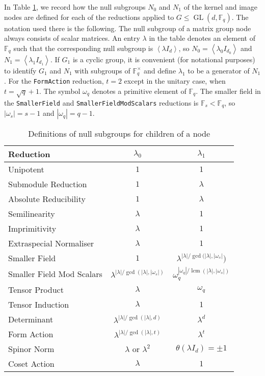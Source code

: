 \documentclass[12pt,twoside,reqno,psamsfonts]{amsproc}
\newcommand{\nullsubgp}{{null subgroup}\xspace}
\numberwithin{equation}{section}
\numberwithin{figure}{section}
\theoremstyle{plain}
\theoremstyle{definition}
\theoremstyle{remark}
\providecommand{\abs}[1]{\left\lvert #1 \right\rvert}
\providecommand{\set}[1]{\left\lbrace #1 \right\rbrace}
\providecommand{\gen}[1]{\left\langle #1 \right\rangle}
\newcommand{\field}[1]{\mathbb{#1}}
\newcommand{\F}{\field{F}}
\DeclareMathOperator{\lcm}{lcm}
\DeclareMathOperator{\GL}{GL}
\begin{document}
In Table \ref{tbl:scalar_propagation}, we record how 
the {\nullsubgp}s $N_0$ and $N_1$ of the kernel and image nodes are defined for 
each of the reductions applied to $G \leqslant \GL(d,\F_q)$.
The notation used there is the following.
The {\nullsubgp} of a matrix group node always consists of scalar matrices.
An entry $\lambda$ in the table denotes an element of $\F_q$  such that 
the corresponding {\nullsubgp} is $\gen{\lambda I_d}$, 
so $N_0=\gen{\lambda_0 I_{d_0}}$ and $N_1 = \gen{\lambda_1 I_{d_1}}$.
If $G_1$ is a cyclic group, it is convenient (for notational purposes) 
to identify $G_1$ and $N_1$
with subgroups of $\F_q^\times$ and define $\lambda_1$ to be a
generator of $N_1$.
For the {\tt FormAction} reduction, $t = 2$ except in the unitary case, 
when $t = \sqrt{q} + 1$. 
The symbol $\omega_q$ denotes a primitive element of $\F_q$.
The smaller field in the
{\tt SmallerField} and {\tt SmallerFieldModScalars} reductions is
$\F_s < \F_q$, so $\abs{ \omega_s}  = s-1$ and $\abs{\omega_q} =q-1$.

\begin{table}[h]
\begin{tabular}{l|c|c}
Reduction & $\lambda_0$ & $\lambda_1$ \\
\hline
Unipotent & $1$ & $1$ \\
Submodule Reduction & $1$ & $\lambda$ \\
Absolute Reducibility & $1$ & $\lambda$ \\
Semilinearity & $\lambda$ & $1$ \\
Imprimitivity & $\lambda$ & $1$ \\
Extraspecial Normaliser & $\lambda$ & $1$ \\
Smaller Field & $1$ & $\lambda^{\abs{\lambda} / 
\gcd(\abs{\lambda}, \abs{\omega_s}})$ \\
Smaller Field Mod Scalars & 
$\lambda^{\abs{\lambda} / \gcd(\abs{\lambda}, \abs{\omega_s})}$ & 
                            $\omega_q^{\abs{\omega_q} / \lcm(\abs{\lambda}, \abs{\omega_s})}$  \\
Tensor Product & $\lambda$ & $\omega_q$  \\
Tensor Induction & $\lambda$ & $1$ \\
Determinant & $\lambda^{\abs{\lambda} / \gcd(\abs{\lambda}, d)}$ & $\lambda^d$  \\ 
Form Action & $\lambda^{\abs{\lambda} / \gcd(\abs{\lambda}, t)}$ & $\lambda^t$  \\ 
Spinor Norm & $\lambda$ or $\lambda^2$ & $\theta(\lambda I_d) = \pm{1}$  \\
Coset Action & $\lambda$ & $1$ 
\end{tabular}
\caption{Definitions of {\nullsubgp}s for children of a node}
\label{tbl:scalar_propagation}
\end{table}
\end{document}
